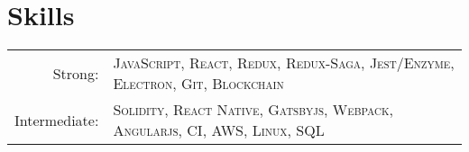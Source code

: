 \documentclass[a4paper,10pt]{article}
\begin{document}
\section{Skills}
\begin{tabular}{rl}
    Strong:& \textsc{JavaScript}, \textsc{React}, \textsc{Redux}, \textsc{Redux-Saga}, \textsc{Jest/Enzyme}, \textsc{Electron}, \textsc{Git}, \textsc{Blockchain}\\
    Intermediate:& \textsc{Solidity}, \textsc{React Native}, \textsc{Gatsbyjs}, \textsc{Webpack}, \textsc{Angularjs}, \textsc{CI}, \textsc{AWS}, \textsc{Linux}, \textsc{SQL}\\
\end{tabular}
\end{document}
